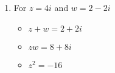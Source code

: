 \begin{enumerate}
\begin{multicols}{3}
\begin{itemize}

\item $z+w = -1+3i$

\item $zw = -2-i$

\item $z^2 = -1$

\end{itemize}

\end{multicols}

\begin{multicols}{3}

\begin{itemize}

\item $\frac{1}{z} = -i$

\item $\frac{z}{w} = \frac{2}{5} - \frac{1}{5} \, i$

\item $\frac{w}{z} = 2+i$

\end{itemize}

\end{multicols}

\begin{multicols}{3}

\begin{itemize}

\item $\overline{z} = -i$

\item $z\overline{z} = 1$

\item $(\overline{z})^2 = -1$

\end{itemize}

\end{multicols}

\item  For  $z = 4i$ and $w = 2-2i$

\begin{multicols}{3}

\begin{itemize}

\item $z+w = 2+2i$

\item $zw = 8+8i$

\item $z^2 = -16$


\end{itemize}
\end{multicols}
\end{enumerate}
